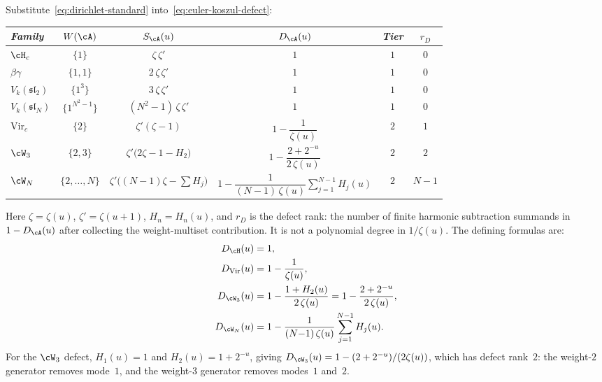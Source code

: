 \begin{computation}%
\label{comp:euler-koszul-defect-table}%
%
Substitute~\eqref{eq:dirichlet-standard}
into~\eqref{eq:euler-koszul-defect}:
\begin{center}
\renewcommand{\arraystretch}{1.35}
\begin{tabular}{lccccc}
\toprule
\emph{Family} & $W(\cA)$ & $S_\cA(u)$ & $D_\cA(u)$ & \emph{Tier}
 & $r_D$ \\
\midrule
$\cH_c$ & $\{1\}$ & $\zeta\,\zeta'$
 & $1$ & $1$ & $0$ \\
$\beta\gamma$ & $\{1,1\}$ & $2\,\zeta\,\zeta'$
 & $1$ & $1$ & $0$ \\
$V_k(\mathfrak{sl}_2)$ & $\{1^3\}$ & $3\,\zeta\,\zeta'$
 & $1$ & $1$ & $0$ \\
$V_k(\mathfrak{sl}_N)$ & $\{1^{N^2-1}\}$
 & $(N^2{-}1)\,\zeta\,\zeta'$
 & $1$ & $1$ & $0$ \\[3pt]
$\mathrm{Vir}_c$ & $\{2\}$
 & $\zeta'(\zeta{-}1)$
 & $1 - \dfrac{1}{\zeta(u)}$ & $2$ & $1$ \\[6pt]
$\cW_3$ & $\{2,3\}$
 & $\zeta'\bigl(2\zeta-1-H_2\bigr)$
 & $1 - \dfrac{2+2^{-u}}{2\,\zeta(u)}$ & $2$ & $2$ \\[6pt]
$\cW_N$ & $\{2,\ldots,N\}$
 & $\zeta'\bigl((N{-}1)\zeta-\sum H_j\bigr)$
 & $1 - \dfrac{1}{(N{-}1)\,\zeta(u)}
 \displaystyle\sum_{j=1}^{N-1}H_j(u)$
 & $2$ & $N{-}1$ \\
\bottomrule
\end{tabular}
\end{center}
Here $\zeta = \zeta(u)$, $\zeta' = \zeta(u{+}1)$,
$H_n = H_n(u)$, and
\emph{$r_D$} is the defect rank: the number of finite harmonic
subtraction summands in $1-D_\cA(u)$ after collecting the
weight-multiset contribution. It is not a polynomial degree in
$1/\zeta(u)$.
The defining formulas are:
\begin{align}
D_{\cH}(u) &= 1,
\label{eq:defect-heisenberg}
\\
D_{\mathrm{Vir}}(u) &= 1 - \frac{1}{\zeta(u)},
\label{eq:defect-virasoro}
\\
D_{\cW_3}(u) &= 1 - \frac{1 + H_2(u)}{2\,\zeta(u)}
= 1 - \frac{2 + 2^{-u}}{2\,\zeta(u)},
\label{eq:defect-w3}
\\
D_{\cW_N}(u) &= 1 -
\frac{1}{(N{-}1)\,\zeta(u)}\sum_{j=1}^{N-1}H_j(u).
\label{eq:defect-wn}
\end{align}
For the $\cW_3$ defect, $H_1(u) = 1$ and
$H_2(u) = 1 + 2^{-u}$, giving
$D_{\cW_3}(u) = 1 - (2 + 2^{-u})/(2\zeta(u))$,
which has defect rank~$2$: the weight-$2$ generator removes mode~$1$,
and the weight-$3$ generator removes modes~$1$ and~$2$.


\end{computation}
